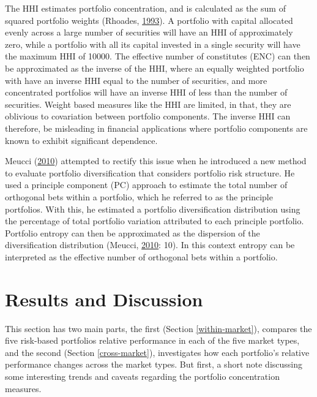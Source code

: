 \documentclass[11pt,preprint, authoryear]{elsarticle}
\numberwithin{equation}{section}
\numberwithin{figure}{section}
\numberwithin{table}{section}
\begin{document}
The HHI estimates portfolio concentration, and is calculated as the sum
of squared portfolio weights (Rhoades,
\protect\hyperlink{ref-rhoades1993}{1993}). A portfolio with capital
allocated evenly across a large number of securities will have an HHI of
approximately zero, while a portfolio with all its capital invested in a
single security will have the maximum HHI of 10000. The effective number
of constitutes (ENC) can then be approximated as the inverse of the HHI,
where an equally weighted portfolio with have an inverse HHI equal to
the number of securities, and more concentrated portfolios will have an
inverse HHI of less than the number of securities. Weight based measures
like the HHI are limited, in that, they are oblivious to covariation
between portfolio components. The inverse HHI can therefore, be
misleading in financial applications where portfolio components are
known to exhibit significant dependence.

Meucci (\protect\hyperlink{ref-meucci2010}{2010}) attempted to rectify
this issue when he introduced a new method to evaluate portfolio
diversification that considers portfolio risk structure. He used a
principle component (PC) approach to estimate the total number of
orthogonal bets within a portfolio, which he referred to as the
principle portfolios. With this, he estimated a portfolio
diversification distribution using the percentage of total portfolio
variation attributed to each principle portfolio. Portfolio entropy can
then be approximated as the dispersion of the diversification
distribution (Meucci, \protect\hyperlink{ref-meucci2010}{2010}: 10). In
this context entropy can be interpreted as the effective number of
orthogonal bets within a portfolio.

\hypertarget{results-and-discussion}{%
\section{\texorpdfstring{Results and Discussion
\label{reasults}}{Results and Discussion }}\label{results-and-discussion}}

This section has two main parts, the first (Section
\ref{within-market}), compares the five risk-based portfolios relative
performance in each of the five market types, and the second (Section
\ref{cross-market}), investigates how each portfolio's relative
performance changes across the market types. But first, a short note
discussing some interesting trends and caveats regarding the portfolio
concentration measures.
\end{document}

